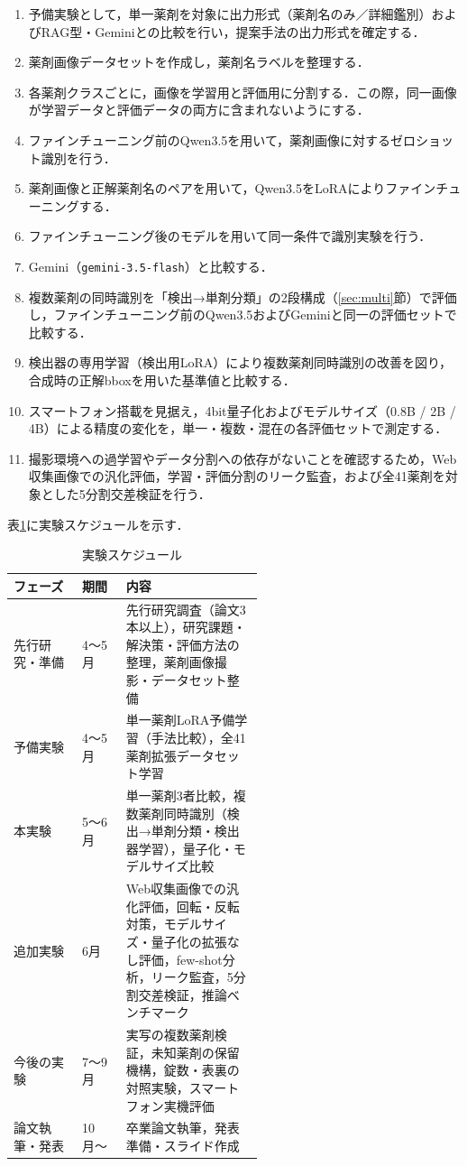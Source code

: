\documentclass[dvipdfmx]{jsarticle}
\begin{document}
\begin{enumerate}
  \item 予備実験として，単一薬剤を対象に出力形式（薬剤名のみ／詳細鑑別）およびRAG型・Geminiとの比較を行い，提案手法の出力形式を確定する．
  \item 薬剤画像データセットを作成し，薬剤名ラベルを整理する．
  \item 各薬剤クラスごとに，画像を学習用と評価用に分割する．この際，同一画像が学習データと評価データの両方に含まれないようにする．
  \item ファインチューニング前のQwen3.5を用いて，薬剤画像に対するゼロショット識別を行う．
  \item 薬剤画像と正解薬剤名のペアを用いて，Qwen3.5をLoRAによりファインチューニングする．
  \item ファインチューニング後のモデルを用いて同一条件で識別実験を行う．
  \item Gemini（\texttt{gemini-3.5-flash}）と比較する．
  \item 複数薬剤の同時識別を「検出→単剤分類」の2段構成（\ref{sec:multi}節）で評価し，ファインチューニング前のQwen3.5およびGeminiと同一の評価セットで比較する．
  \item 検出器の専用学習（検出用LoRA）により複数薬剤同時識別の改善を図り，合成時の正解bboxを用いた基準値と比較する．
  \item スマートフォン搭載を見据え，4bit量子化およびモデルサイズ（0.8B / 2B / 4B）による精度の変化を，単一・複数・混在の各評価セットで測定する．
  \item 撮影環境への過学習やデータ分割への依存がないことを確認するため，Web収集画像での汎化評価，学習・評価分割のリーク監査，および全41薬剤を対象とした5分割交差検証を行う．
\end{enumerate}

表\ref{tab:schedule}に実験スケジュールを示す．

\begin{table}[h]
\centering
\caption{実験スケジュール}
\label{tab:schedule}
\begin{tabular}{llp{0.55\linewidth}}
\hline
フェーズ & 期間 & 内容 \\
\hline
先行研究・準備 & 4〜5月 & 先行研究調査（論文3本以上），研究課題・解決策・評価方法の整理，薬剤画像撮影・データセット整備 \\
予備実験       & 4〜5月 & 単一薬剤LoRA予備学習（手法比較），全41薬剤拡張データセット学習 \\
本実験         & 5〜6月 & 単一薬剤3者比較，複数薬剤同時識別（検出→単剤分類・検出器学習），量子化・モデルサイズ比較 \\
追加実験       & 6月 & Web収集画像での汎化評価，回転・反転対策，モデルサイズ・量子化の拡張なし評価，few-shot分析，リーク監査，5分割交差検証，推論ベンチマーク \\
今後の実験     & 7〜9月 & 実写の複数薬剤検証，未知薬剤の保留機構，錠数・表裏の対照実験，スマートフォン実機評価 \\
論文執筆・発表 & 10月〜 & 卒業論文執筆，発表準備・スライド作成 \\
\hline
\end{tabular}
\end{table}
\end{document}
